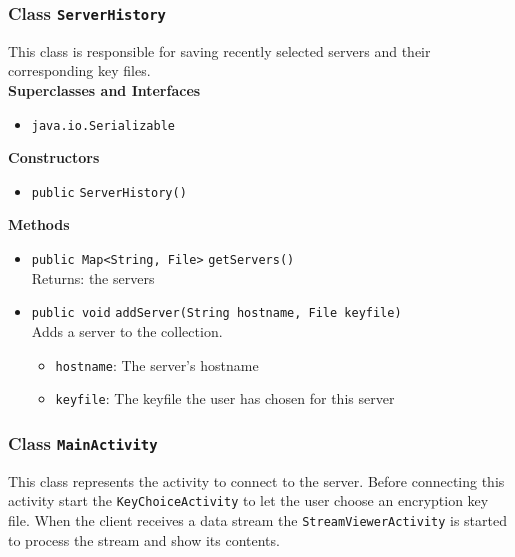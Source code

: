 \subsubsection{Class \lstinline|ServerHistory|}
This class is responsible for saving recently selected servers
 and their corresponding key files. \\


\textbf{Superclasses and Interfaces}
\begin{itemize}
\item \lstinline|java.io.Serializable|
\end{itemize}



\textbf{Constructors}
\begin{itemize}
\item \lstinline|public| \lstinline|ServerHistory|\lstinline|()|




\end{itemize}


\textbf{Methods}
\begin{itemize}
\item \lstinline|public Map<String, File>| \lstinline|getServers|\lstinline|()|\\
Returns: the servers



\item \lstinline|public void| \lstinline|addServer|\lstinline|(String hostname, File keyfile)|\\
Adds a server to the collection.
\begin{itemize}
\item \lstinline|hostname|: The server's hostname
\item \lstinline|keyfile|: The keyfile the user has chosen for this server
\end{itemize}



\end{itemize}

\subsubsection{Class \lstinline|MainActivity|}
This class represents the activity to connect to the server.
 Before connecting this activity start the \lstinline|KeyChoiceActivity| to
 let the user choose an encryption key file. When the client receives a
 data stream the \lstinline|StreamViewerActivity| is started to process the
 stream and show its contents. \\


